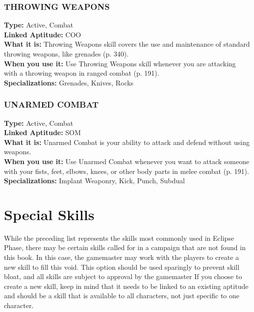 \subsubsection{THROWING WEAPONS}
\textbf{Type:} Active, Combat
\\ \textbf{Linked Aptitude:} COO
\\ \textbf{What it is:} Throwing Weapons skill covers the use
and maintenance of standard throwing weapons, like
grenades (p. 340).
\\ \textbf{When you use it:} Use Throwing Weapons skill
whenever you are attacking with a throwing weapon
in ranged combat (p. 191).
\\ \textbf{Specializations:} Grenades, Knives, Rocks



\subsubsection{UNARMED COMBAT}
\textbf{Type:} Active, Combat
\\ \textbf{Linked Aptitude:} SOM
\\ \textbf{What it is:} Unarmed Combat is your ability to attack and
defend without using weapons.
\\ \textbf{When you use it:} Use Unarmed Combat whenever you
want to attack someone with your fists, feet, elbows, knees,
or other body parts in melee combat (p. 191).
\\ \textbf{Specializations:} Implant Weaponry, Kick, Punch, Subdual


\section{Special Skills}
While the preceding list represents the skills most commonly
used in Eclipse Phase, there may be certain skills called for in a
campaign that are not found in this book. In this case, the gamemaster
may work with the players to create a new skill to fill
this void. This option should be used sparingly to prevent skill
bloat, and all skills are subject to approval by the gamemaster
If you choose to create a new skill, keep in mind that it needs
to be linked to an existing aptitude and should be a skill that
is available to all characters, not just specific to one character.

